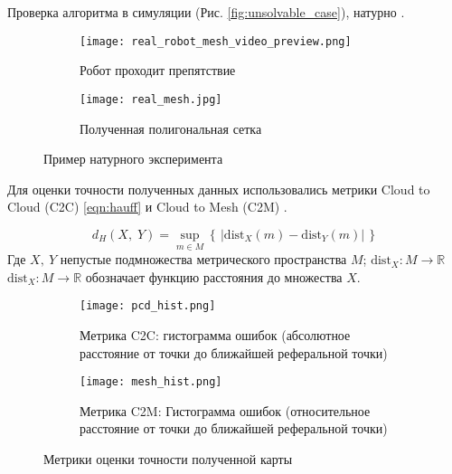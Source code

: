 Проверка алгоритма в симуляции (Рис. \ref{fig:unsolvable_case}), натурно .

\begin{figure}[H]
    \begin{subfigure}[t]{0.49\textwidth}
            \centering\texttt{[image: real\_robot\_mesh\_video\_preview.png]}
        \caption{Робот проходит препятствие}
        \label{fig:real_robot_mesh_video_preview.png}
    \end{subfigure}
    \begin{subfigure}[t]{0.49\textwidth}
        \centering\texttt{[image: real\_mesh.jpg]}
        \caption{Полученная полигональная сетка}
        \label{fig:real_mesh.jpg}
    \end{subfigure}
    \caption{Пример натурного эксперимента}
    \label{fig:real_exp_map_creation}
\end{figure}

Для оценки точности полученных данных использовались метрики Cloud to Cloud (C2C) \eqref{eqn:hauff} и Cloud to Mesh (C2M) .

\begin{equation}
    \label{eqn:hauff}
    d_{H}(X,\;Y)=\sup _{m\in M}\left\{\,|\mathrm {dist} _{X}(m)-\mathrm {dist} _{Y}(m)|\,\right\}    
\end{equation}
Где $X,\ Y$ непустые подмножества метрического пространства $M$; $\mathrm {dist} _{X}\colon M\to \mathbb {R}$ $\mathrm {dist} _{X}\colon M\to \mathbb {R}$ обозначает функцию расстояния до множества $X$.


\begin{figure}[ht!]
    \begin{subfigure}[t]{0.49\textwidth}
        \centering\texttt{[image: pcd\_hist.png]}
        \caption{Метрика C2C: гистограмма ошибок (абсолютное расстояние от точки до ближайшей реферальной точки)}
        \label{fig:metric_c2c}
    \end{subfigure}
    \begin{subfigure}[t]{0.49\textwidth}
        \centering\texttt{[image: mesh\_hist.png]}
        \caption{Метрика C2M: Гистограмма ошибок (относительное расстояние от точки до ближайшей реферальной точки)}
        \label{fig:metric_c2m}
    \end{subfigure}
    \caption{Метрики оценки точности полученной карты}
    \label{fig:metrics}
\end{figure}


